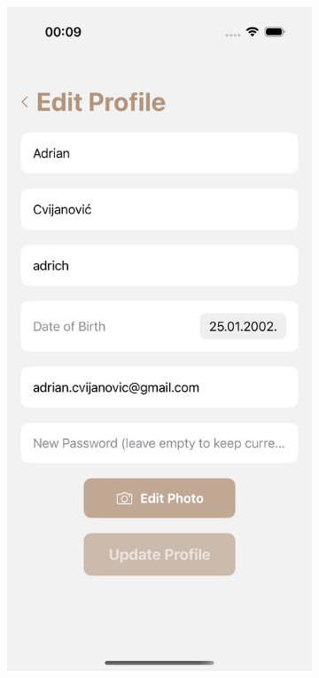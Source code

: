 \begin{figure}[H]
\begin{subfigure}[b]{0.35\textwidth}
        \includegraphics[width=\textwidth]{images/implementacija/editing-options/edit_profile.png}

\end{subfigure}
\end{figure}
